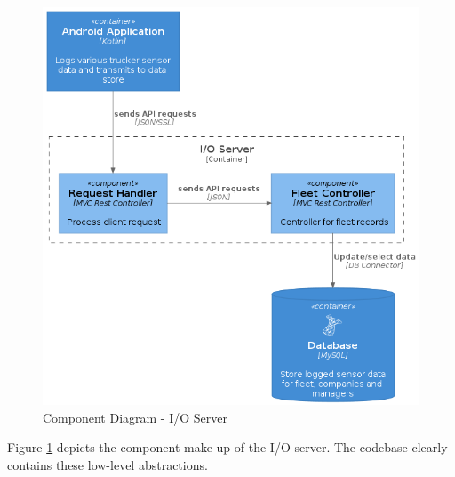 \begin{figure}[H]
\centering
\includegraphics[width=6in]{IO_component.png}
\caption{Component Diagram - I/O Server}
\label{fig:IO_component}
\end{figure}

Figure \ref{fig:IO_component} depicts the component make-up of the I/O server.
The codebase clearly contains these low-level abstractions.

